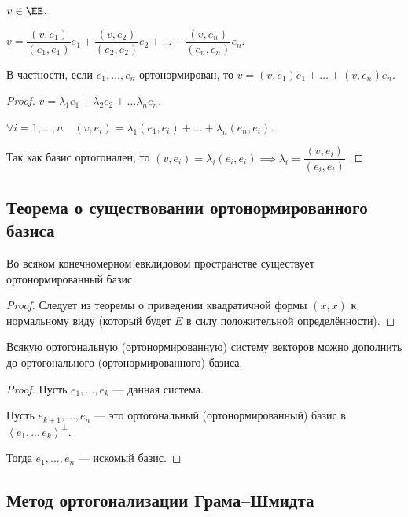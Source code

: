 $v \in \EE$.

\begin{proposal}
    $v = \dfrac{(v, e_1)}{(e_1, e_1)}e_1 + \dfrac{(v, e_2)}{(e_2, e_2)}e_2 + \dots + \dfrac{(v, e_n)}{(e_n, e_n)}e_n$.

    В частности, если $e_1, \dots, e_n$ ортонормирован, то $v = (v, e_1)e_1 + \dots + (v, e_n) e_n$.
\end{proposal}

\begin{proof}
    $v = \lambda_1 e_1 + \lambda_2 e_2 + \dots \lambda_n e_n$.

    $\forall i = 1, \dots, n \quad (v, e_i) = \lambda_1 (e_1, e_i) + \dots + \lambda_n (e_n, e_i)$.

    Так как базис ортогонален, то $(v, e_i) = \lambda_i (e_i, e_i) \implies \lambda_i = \dfrac{(v, e_i)}{(e_i, e_i)}$.
\end{proof}


\subsection{Теорема о существовании ортонормированного базиса}

\begin{theorem}
    Во всяком конечномерном евклидовом пространстве существует ортонормированный базис.
\end{theorem}

\begin{proof}
    Следует из теоремы о приведении квадратичной формы $(x, x)$ к нормальному виду (который будет $E$ в силу положительной определённости).
\end{proof}

\begin{corollary}
    Всякую ортогональную (ортонормированную) систему векторов можно дополнить до ортогонального (ортонормированного) базиса.
\end{corollary}

\begin{proof}
    Пусть $e_1, \dots, e_k$ --- данная система. 

    Пусть $e_{k + 1}, \dots, e_{n}$ --- это ортогональный (ортонормированный) базис в $\left< e_1, .., e_k \right>^{\perp}$.

    Тогда $e_1, \dots, e_n$ --- искомый базис.
\end{proof}



\subsection{Метод ортогонализации Грама–Шмидта}


